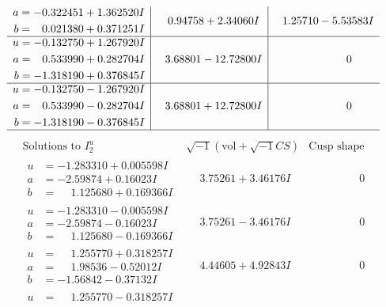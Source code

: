 \documentclass[1p]{elsarticle_modified}
\theoremstyle{definition}
\newcommand{\I}{\sqrt{-1}}
\begin{document}
$$\begin{array}{c|c|c}
\begin{aligned}
a &= -0.322451 + 1.362520 I \\
b &= \phantom{-}0.021380 + 0.371251 I\end{aligned}
 & \phantom{-}0.94758 + 2.34060 I & \phantom{-}1.25710 - 5.53583 I \\ \hline\begin{aligned}
u &= -0.132750 + 1.267920 I \\
a &= \phantom{-}0.533990 + 0.282704 I \\
b &= -1.318190 + 0.376845 I\end{aligned}
 & \phantom{-}3.68801 - 12.72800 I & \phantom{-0.000000 } 0 \\ \hline\begin{aligned}
u &= -0.132750 - 1.267920 I \\
a &= \phantom{-}0.533990 - 0.282704 I \\
b &= -1.318190 - 0.376845 I\end{aligned}
 & \phantom{-}3.68801 + 12.72800 I & \phantom{-0.000000 } 0\\
 \hline 
 \end{array}$$\newpage$$\begin{array}{c|c|c}  
\text{Solutions to }I^u_{2}& \I (\text{vol} + \sqrt{-1}CS) & \text{Cusp shape}\\
 \hline 
\begin{aligned}
u &= -1.283310 + 0.005598 I \\
a &= -2.59874 + 0.16023 I \\
b &= \phantom{-}1.125680 + 0.169366 I\end{aligned}
 & \phantom{-}3.75261 + 3.46176 I & \phantom{-0.000000 } 0 \\ \hline\begin{aligned}
u &= -1.283310 - 0.005598 I \\
a &= -2.59874 - 0.16023 I \\
b &= \phantom{-}1.125680 - 0.169366 I\end{aligned}
 & \phantom{-}3.75261 - 3.46176 I & \phantom{-0.000000 } 0 \\ \hline\begin{aligned}
u &= \phantom{-}1.255770 + 0.318257 I \\
a &= \phantom{-}1.98536 - 0.52012 I \\
b &= -1.56842 - 0.37132 I\end{aligned}
 & \phantom{-}4.44605 + 4.92843 I & \phantom{-0.000000 } 0 \\ \hline\begin{aligned}
u &= \phantom{-}1.255770 - 0.318257 I \\

\end{aligned}
\end{array}$$
\end{document}
